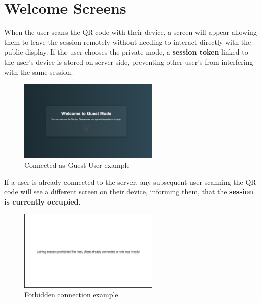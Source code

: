 \section{Welcome Screens}

When the user scans the QR code with their device, a screen will appear allowing them to leave the 
session remotely without needing to interact directly with the public display. 
If the user chooses the private mode, a \textbf{session token} linked to the user's device is stored on server side, preventing other 
user's from interfering with the same session.

\begin{figure}[H]
    \centering
    \includegraphics[width=0.6\textwidth]{images/WelcomeScreen.png}
    \caption{Connected as Guest-User example}
\end{figure}

If a user is already connected to the server, any subsequent user scanning the QR code will see 
a different screen on their device, informing them, that the \textbf{session is currently occupied}.

\begin{figure}[H]
    \centering
    \includegraphics[width=0.6\textwidth]{images/WelcomeScreenInvalid.png}
    \caption{Forbidden connection example}
\end{figure}
